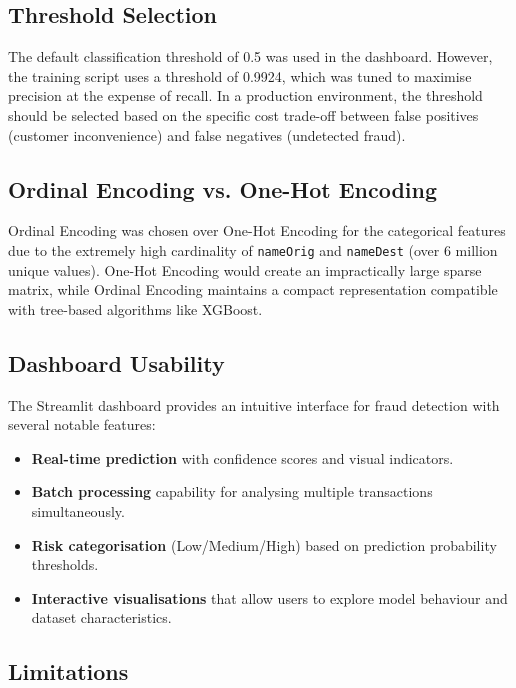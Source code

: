 \documentclass[12pt,a4paper]{report}
\begin{document}
\subsection{Threshold Selection}

The default classification threshold of 0.5 was used in the dashboard. However, the training script uses a threshold of 0.9924, which was tuned to maximise precision at the expense of recall. In a production environment, the threshold should be selected based on the specific cost trade-off between false positives (customer inconvenience) and false negatives (undetected fraud).

\subsection{Ordinal Encoding vs. One-Hot Encoding}

Ordinal Encoding was chosen over One-Hot Encoding for the categorical features due to the extremely high cardinality of \texttt{nameOrig} and \texttt{nameDest} (over 6 million unique values). One-Hot Encoding would create an impractically large sparse matrix, while Ordinal Encoding maintains a compact representation compatible with tree-based algorithms like XGBoost.

\subsection{Dashboard Usability}

The Streamlit dashboard provides an intuitive interface for fraud detection with several notable features:
\begin{itemize}
    \item \textbf{Real-time prediction} with confidence scores and visual indicators.
    \item \textbf{Batch processing} capability for analysing multiple transactions simultaneously.
    \item \textbf{Risk categorisation} (Low/Medium/High) based on prediction probability thresholds.
    \item \textbf{Interactive visualisations} that allow users to explore model behaviour and dataset characteristics.
\end{itemize}

\subsection{Limitations}
\end{document}
